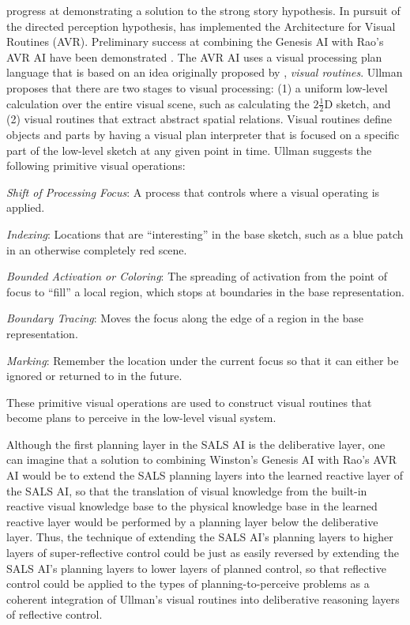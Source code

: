 progress at demonstrating a solution to the strong story hypothesis.
In pursuit of the directed perception hypothesis, \cite{rao:1998} has
implemented the Architecture for Visual Routines (AVR).  Preliminary
success at combining the Genesis AI with Rao's AVR AI have been
demonstrated \cite[]{winston:2011}.  The AVR AI uses a visual
processing plan language that is based on an idea originally proposed
by \cite{ullman:1984}, {\emph{visual routines}}.  Ullman proposes that
there are two stages to visual processing: (1) a uniform low-level
calculation over the entire visual scene, such as calculating the
$2\frac{1}{2}$D sketch, and (2) visual routines that extract abstract
spatial relations.  Visual routines define objects and parts by having
a visual plan interpreter that is focused on a specific part of the
low-level sketch at any given point in time.  Ullman suggests the
following primitive visual operations:
\begin{packed_enumerate}
\item{\emph{Shift of Processing Focus}: A process that controls where
  a visual operating is applied.}
\item{\emph{Indexing}: Locations that are ``interesting'' in the base
  sketch, such as a blue patch in an otherwise completely red scene.}
\item{\emph{Bounded Activation or Coloring}: The spreading of
  activation from the point of focus to ``fill'' a local region, which
  stops at boundaries in the base representation.}
\item{\emph{Boundary Tracing}: Moves the focus along the edge of a
  region in the base representation.}
\item{\emph{Marking}: Remember the location under the current focus so
  that it can either be ignored or returned to in the future.}
\end{packed_enumerate}
These primitive visual operations are used to construct visual
routines that become plans to perceive
\cite[]{pryor:1992,pryorcollins:1995,velez:2011} in the low-level
visual system.

Although the first planning layer in the SALS AI is the deliberative
layer, one can imagine that a solution to combining Winston's Genesis
AI with Rao's AVR AI would be to extend the SALS planning layers into
the learned reactive layer of the SALS AI, so that the translation of
visual knowledge from the built-in reactive visual knowledge base to
the physical knowledge base in the learned reactive layer would be
performed by a planning layer below the deliberative layer.  Thus, the
technique of extending the SALS AI's planning layers to higher layers
of super-reflective control could be just as easily reversed by
extending the SALS AI's planning layers to lower layers of planned
control, so that reflective control could be applied to the types of
planning-to-perceive problems as a coherent integration of Ullman's
visual routines into deliberative reasoning layers of reflective
control.

